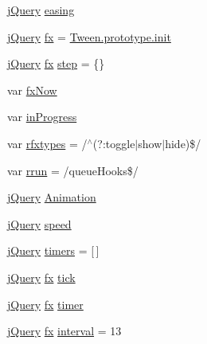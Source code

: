 \begin{DoxyCompactItemize}
\item 
\hyperlink{jquery-3_82_81_8js_a609525712f1102566c2b03866ceb2bba}{j\+Query} \hyperlink{jquery-3_82_81_8js_a9758a312629fa6de1744280dd6e6253b}{easing}
\item 
\hyperlink{jquery-3_82_81_8js_a609525712f1102566c2b03866ceb2bba}{j\+Query} \hyperlink{jquery-3_82_81_8js_afbcf56cb9545c8bc885722b4fe4253ce}{fx} = \hyperlink{jquery-3_82_81_8js_a8925a317299daf39d8500f1e56e5216b}{Tween.\+prototype.\+init}
\item 
\hyperlink{jquery-3_82_81_8js_a609525712f1102566c2b03866ceb2bba}{j\+Query} \hyperlink{jquery-3_82_81_8js_afbcf56cb9545c8bc885722b4fe4253ce}{fx} \hyperlink{jquery-3_82_81_8js_a7337229078e935a813e7e0f674fad739}{step} = \{\}
\item 
var \hyperlink{jquery-3_82_81_8js_a008b3271e2f410e89917bc6d96096296}{fx\+Now}
\item 
var \hyperlink{jquery-3_82_81_8js_a3cc8d8f2f5bd39b6b83abe0cf6ad1b5e}{in\+Progress}
\item 
var \hyperlink{jquery-3_82_81_8js_a28b1e14ecaade6675453a292b2c1dba6}{rfxtypes} = /$^\wedge$(?\+:toggle$\vert$show$\vert$hide)\$/
\item 
var \hyperlink{jquery-3_82_81_8js_acf9d5e6b315eca81eb432bb6ee280a2e}{rrun} = /queue\+Hooks\$/
\item 
\hyperlink{jquery-3_82_81_8js_a609525712f1102566c2b03866ceb2bba}{j\+Query} \hyperlink{jquery-3_82_81_8js_a3299b781c8ec8287357326920ab3565a}{Animation}
\item 
\hyperlink{jquery-3_82_81_8js_a609525712f1102566c2b03866ceb2bba}{j\+Query} \hyperlink{jquery-3_82_81_8js_add98c90065e6563cba26ff6d2016c46c}{speed}
\item 
\hyperlink{jquery-3_82_81_8js_a609525712f1102566c2b03866ceb2bba}{j\+Query} \hyperlink{jquery-3_82_81_8js_a90bf6571856437dc2269be68a12c1d5a}{timers} = \mbox{[}$\,$\mbox{]}
\item 
\hyperlink{jquery-3_82_81_8js_a609525712f1102566c2b03866ceb2bba}{j\+Query} \hyperlink{jquery-3_82_81_8js_afbcf56cb9545c8bc885722b4fe4253ce}{fx} \hyperlink{jquery-3_82_81_8js_a4820e1fd61053b39dd3bbd8cac9f48ba}{tick}
\item 
\hyperlink{jquery-3_82_81_8js_a609525712f1102566c2b03866ceb2bba}{j\+Query} \hyperlink{jquery-3_82_81_8js_afbcf56cb9545c8bc885722b4fe4253ce}{fx} \hyperlink{jquery-3_82_81_8js_a2b44b4db680ed005831a801cef9f8bb3}{timer}
\item 
\hyperlink{jquery-3_82_81_8js_a609525712f1102566c2b03866ceb2bba}{j\+Query} \hyperlink{jquery-3_82_81_8js_afbcf56cb9545c8bc885722b4fe4253ce}{fx} \hyperlink{jquery-3_82_81_8js_a22f2d1dcf51c862e922248df75aaa9f7}{interval} = 13

\end{DoxyCompactItemize}
